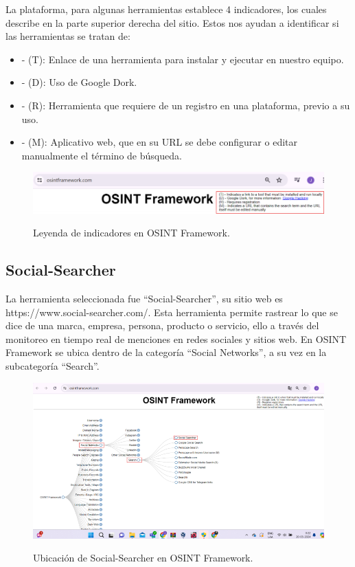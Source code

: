 \documentclass[stu, 11pt, letterpaper, donotrepeattitle, floatsintext, natbib]{apa7}
\begin{document}
La plataforma, para algunas herramientas establece 4 indicadores, los cuales describe en la parte superior derecha del sitio. Estos nos ayudan a identificar si las herramientas se tratan de:

\begin{itemize}
\item[] - (T): Enlace de una herramienta para instalar y ejecutar en nuestro equipo.
\item[] - (D): Uso de Google Dork.
\item[] - (R): Herramienta que requiere de un registro en una plataforma, previo a su uso.
\item[] - (M): Aplicativo web, que en su URL se debe configurar o editar manualmente el término de búsqueda. 
\end{itemize}

\begin{figure}[H]
\centering
\caption{Leyenda de indicadores en OSINT Framework.}
\includegraphics[width=0.75\linewidth]{osi2.png} %
\label{fig:OverallEffect}
\end{figure}

\subsection{Social-Searcher}

La herramienta seleccionada fue “Social-Searcher”, su sitio web es https://www.social-searcher.com/. Esta herramienta permite rastrear lo que se dice de una marca, empresa, persona, producto o servicio, ello a través del monitoreo en tiempo real de menciones en redes sociales y sitios web. En OSINT Framework se ubica dentro de la categoría “Social Networks”, a su vez en la subcategoría “Search”.

\begin{figure}[H]
\centering
\caption{Ubicación de Social-Searcher en OSINT Framework.}
\includegraphics[width=0.75\linewidth]{osi3.png} %
\label{fig:OverallEffect}
\end{figure}
\end{document}

